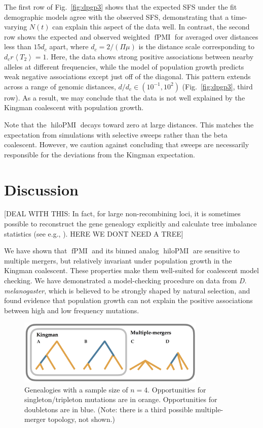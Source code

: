 \documentclass[11pt, letterpaper]{article}   	%
\newcommand{\fig}[1]{Fig.~\ref{#1}}
\newcommand{\E}[1]{\left< #1 \right>}
\DeclareMathOperator{\fpmi}{fPMI}
\DeclareMathOperator{\hilopmi}{hiloPMI}
\begin{document}
The first row of \fig{fig:dpgp3} shows that the expected SFS under the fit demographic models agree with the observed SFS, demonstrating that a time-varying $N(t)$ can explain this aspect of the data well.
In contrast, the second row shows the expected and observed weighted $\fpmi$ for averaged over distances less than $15 d_c$ apart, where $d_c = 2/ (\Pi \mu)$ is the distance scale corresponding to $d_c r \E{T_2} = 1$.
Here, the data shows strong positive associations between nearby alleles at different frequencies, while the model of population growth predicts weak negative associations except just off of the diagonal.
This pattern extends across a range of genomic distances, $d/d_c \in (10^{-1}, 10^2)$ (\fig{fig:dpgp3}, third row).
As a result, we may conclude that the data is not well explained by the Kingman coalescent with population growth.

Note that the $\hilopmi$ decays toward zero at large distances.
This matches the expectation from simulations with selective sweeps rather than the beta coalescent.
However, we caution against concluding that sweeps are necessarily responsible for the deviations from the Kingman expectation.


\section*{Discussion}
[DEAL WITH THIS: In fact, for large non-recombining loci, it is sometimes possible to reconstruct the gene genealogy explicitly and calculate tree imbalance statistics (see e.g., \cite{Seger2010}). HERE WE DONT NEED A TREE]

We have shown that $\fpmi$ and its binned analog $\hilopmi$ are sensitive to multiple mergers, but relatively invariant under population growth in the Kingman coalescent.
These properties make them well-suited for coalescent model checking.
We have demonstrated a model-checking procedure on data from \textit{D. melanogaster}, which is believed to be strongly shaped by natural selection, and found evidence that population growth can not explain the positive associations between high and low frequency mutations.

\begin{figure}
\centering
\includegraphics[width=0.8\textwidth]{figures/trees.png}
\caption{Genealogies with a sample size of $n=4$. Opportunities for singleton/tripleton mutations are in orange. Opportunities for doubletons are in blue. (Note: there is a third possible multiple-merger topology, not shown.) \label{fig:trees}}
\end{figure}
\end{document}
